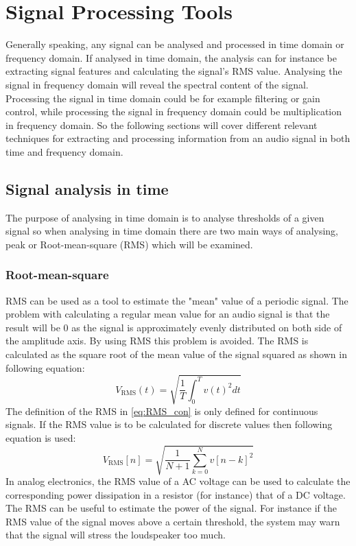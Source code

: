 \chapter{Signal Processing Tools}
Generally speaking, any signal can be analysed and processed in time domain or frequency domain. If analysed in time domain, the analysis can for instance be extracting signal features and calculating the signal's RMS value. Analysing the signal in frequency domain will reveal the spectral content of the signal. Processing the signal in time domain could be for example filtering or gain control, while processing the signal in frequency domain could be multiplication in frequency domain. So the following sections will cover different relevant techniques for extracting and processing information from an audio signal in both time and frequency domain.

\section{Signal analysis in time} \label{sec:SignalTime}
The purpose of analysing in time domain is to analyse thresholds of a given signal so when analysing in time domain there are two main ways of analysing, peak or Root-mean-square (RMS) which will be examined.
\subsection*{Root-mean-square}
RMS can be used as a tool to estimate the "mean" value of a periodic signal. The problem with calculating a regular mean value for an audio signal is that the result will be 0 as the signal is approximately evenly distributed on both side of the amplitude axis. By using RMS this problem is avoided. The RMS is calculated as the square root of the mean value of the signal squared as shown in following equation:
\begin{equation}\label{eq:RMS_con}
V_{\text{RMS}}(t) = \sqrt{\frac{1}{T}\int_0^T v(t)^2 dt}
\end{equation}
The definition of the RMS in \autoref{eq:RMS_con} is only defined for continuous signals. If the RMS value is to be calculated for discrete values then following equation is used:
\begin{equation}
V_{\text{RMS}}[n] = \sqrt{\frac{1}{N+1}\sum_{k=0}^{N} v[n-k]^2}
\end{equation}
In analog electronics, the RMS value of a AC voltage can be used to calculate the corresponding power dissipation in a resistor (for instance) that of a DC voltage. The RMS can be useful to estimate the power of the signal. For instance if the RMS value of the signal moves above a certain threshold, the system may warn that the signal will stress the loudspeaker too much.

